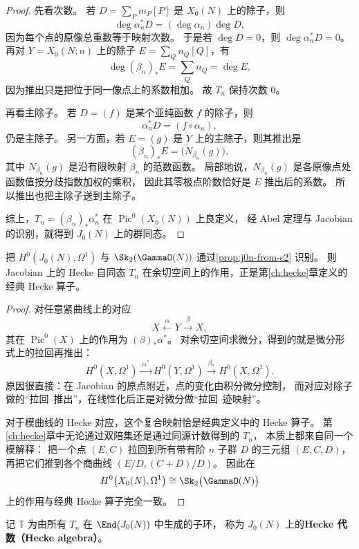 \begin{proof}
先看次数。
若 $D=\sum_P m_P[P]$ 是 $X_0(N)$ 上的除子，则
\[
  \deg \alpha_n^*D=(\deg \alpha_n)\deg D,
\]
因为每个点的原像总重数等于映射次数。
于是若 $\deg D=0$，则 $\deg \alpha_n^*D=0$。
再对 $Y=X_0(N;n)$ 上的除子 $E=\sum_Q n_Q[Q]$，有
\[
  \deg (\beta_n)_*E=\sum_Q n_Q=\deg E,
\]
因为推出只是把位于同一像点上的系数相加。
故 $T_n$ 保持次数 $0$。

再看主除子。
若 $D=(f)$ 是某个亚纯函数 $f$ 的除子，则
\[
  \alpha_n^*D=(f\circ \alpha_n),
\]
仍是主除子。
另一方面，若 $E=(g)$ 是 $Y$ 上的主除子，则其推出是
\[
  (\beta_n)_*E=\bigl(N_{\beta_n}(g)\bigr),
\]
其中 $N_{\beta_n}(g)$ 是沿有限映射 $\beta_n$ 的范数函数。
局部地说，$N_{\beta_n}(g)$ 是各原像点处函数值按分歧指数加权的乘积，
因此其零极点阶数恰好是 $E$ 推出后的系数。
所以推出也把主除子送到主除子。

综上，$T_n=(\beta_n)_*\alpha_n^*$ 在 $\operatorname{Pic}^0(X_0(N))$ 上良定义，
经 Abel 定理与 Jacobian 的识别，就得到 $J_0(N)$ 上的群同态。
\end{proof}

\begin{proposition}
\label{prop:hecke-on-cotangent-jacobian}
把 $H^0(J_0(N),\Omega^1)$ 与 $\Sk_2(\GammaO(N))$ 通过\cref{prop:j0n-from-s2} 识别。
则 Jacobian 上的 Hecke 自同态 $T_n$ 在余切空间上的作用，正是第\ref{ch:hecke}章定义的经典 Hecke 算子。
\end{proposition}

\begin{proof}
对任意紧曲线上的对应
\[
  X \xleftarrow{\alpha} Y \xrightarrow{\beta} X,
\]
其在 $\operatorname{Pic}^0(X)$ 上的作用为 $(\beta)_*\alpha^*$。
对余切空间求微分，得到的就是微分形式上的拉回再推出：
\[
  H^0(X,\Omega^1) \xrightarrow{\ \alpha^*\ } H^0(Y,\Omega^1)
  \xrightarrow{\ \beta_*\ } H^0(X,\Omega^1).
\]
原因很直接：在 Jacobian 的原点附近，点的变化由积分微分控制，
而对应对除子做的“拉回--推出”，在线性化后正是对微分做“拉回--迹映射”。

对于模曲线的 Hecke 对应，这个复合映射恰是经典定义中的 Hecke 算子。
第\ref{ch:hecke}章中无论通过双陪集还是通过同源计数得到的 $T_n$，
本质上都来自同一个模解释：
把一个点 $(E,C)$ 拉回到所有带有阶 $n$ 子群 $D$ 的三元组 $(E,C,D)$，
再把它们推到各个商曲线 $(E/D,(C+D)/D)$。
因此在
\[
  H^0\bigl(X_0(N),\Omega^1\bigr)\cong \Sk_2\bigl(\GammaO(N)\bigr)
\]
上的作用与经典 Hecke 算子完全一致。
\end{proof}

\begin{definition}
\label{def:hecke-algebra-jacobian}
记 $\mathbb T$ 为由所有 $T_n$ 在 $\End(J_0(N))$ 中生成的子环，
称为 $J_0(N)$ 上的\textbf{Hecke 代数（Hecke algebra）}。
\end{definition}

